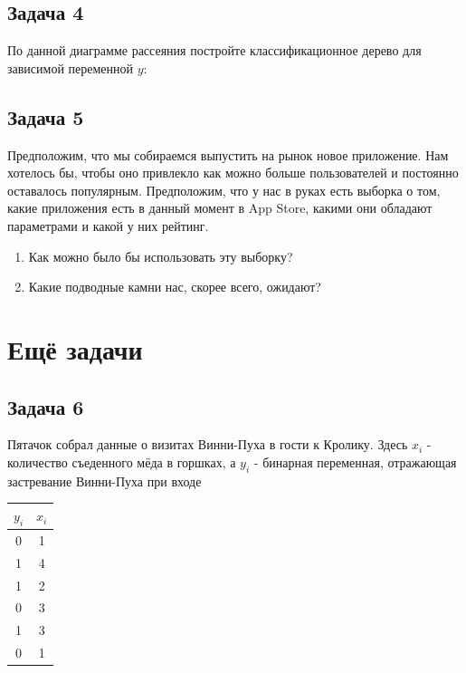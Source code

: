 \documentclass[12pt, a4paper, oneside]{article}
\begin{document}
\subsection*{Задача 4}

По данной диаграмме рассеяния постройте классификационное дерево для зависимой переменной $y$:

	\begin{center}
		\begin{tikzpicture}[scale = 0.015]
		
		\end{tikzpicture}
	\end{center}


\subsection*{Задача 5}

Предположим, что мы собираемся выпустить на рынок новое приложение. Нам хотелось бы,  чтобы оно привлекло как можно больше пользователей и постоянно оставалось популярным. Предположим, что у нас в руках есть выборка о том, какие приложения есть в данный момент в App Store, какими они обладают параметрами и какой у них рейтинг. 

\begin{enumerate} 
	\item Как можно было бы использовать эту выборку? 
	\item Какие подводные камни нас, скорее всего, ожидают? 
\end{enumerate}


\section{Ещё задачи} 

\subsection*{Задача 6}

Пятачок собрал данные о визитах Винни-Пуха в гости к Кролику. Здесь $x_i$ - количество съеденного мёда в горшках, а $y_i$  - бинарная переменная, отражающая застревание Винни-Пуха при входе 

\begin{center}
	\begin{tabular}{c|c}
		$y_i$ & $x_i$ \\
		\hline
		0  & 1 \\
		1 & 4\\
		1 & 2\\
		0 & 3 \\
		1 & 3 \\
		0 & 1
	\end{tabular}
\end{center}
\end{document}
